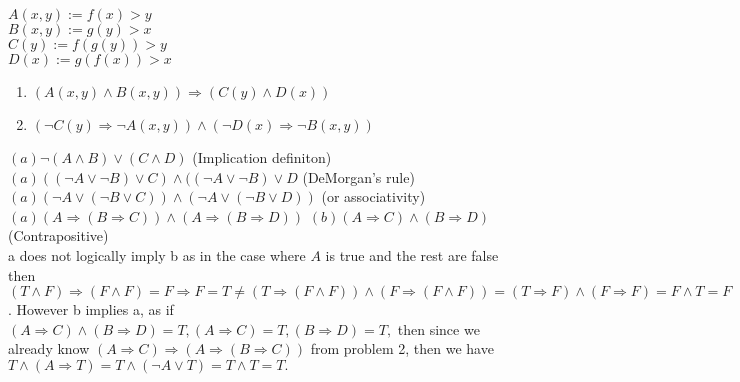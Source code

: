 \documentclass[12pt, letterpaper]{article}
\begin{document}
\begin{enumerate}
\begin{enumerate}
	\end{enumerate}
	$A(x,y) := f(x) > y$\\
		$B(x,y) := g(y) > x$\\
		$C(y) := f(g(y)) > y$\\
		$D(x) := g(f(x)) > x$
		\begin{enumerate}
			\item $(A(x,y) \wedge B(x,y)) \Rightarrow (C(y) \wedge D(x))$
			\item $(\neg C(y) \Rightarrow \neg A(x,y)) \wedge (\neg D(x) \Rightarrow \neg B(x,y))$		
		\end{enumerate}
		$(a) \neg (A \wedge B) \vee (C \wedge D)$ (Implication definiton)\\
		$(a) ((\neg A \vee \neg B) \vee C) \wedge ((\neg A \vee \neg B) \vee D$ (DeMorgan's rule)\\
		$(a) (\neg A \vee( \neg B \vee C)) \wedge (\neg A \vee (\neg B \vee D)) $ (or associativity)\\
		$(a) (A \Rightarrow (B \Rightarrow C)) \wedge (A \Rightarrow (B \Rightarrow D))$
		$(b) (A \Rightarrow C) \wedge (B \Rightarrow D)$ (Contrapositive)\\
	a does not logically imply b as in the case where $A$ is true and the rest are false then $(T \wedge F) \Rightarrow (F \wedge F) = F \Rightarrow F = T \neq (T \Rightarrow (F \wedge F)) \wedge (F \Rightarrow (F \wedge F)) = (T \Rightarrow F) \wedge (F \Rightarrow F) = F \wedge T = F$.  However b implies a, as if $(A \Rightarrow C) \wedge (B \Rightarrow D) = T, (A \Rightarrow C) = T, (B \Rightarrow D) = T, $ then since we already know $(A \Rightarrow C) \Rightarrow (A \Rightarrow (B \Rightarrow C)) $ from problem 2, then we have $T \wedge (A \Rightarrow T) = T \wedge (\neg A \vee T) = T \wedge T = T.$  
	

\end{enumerate}
\end{document}
